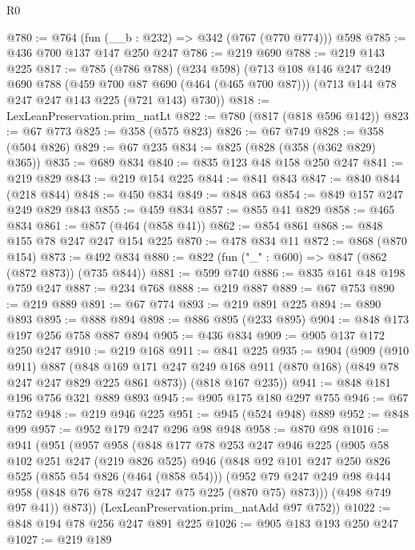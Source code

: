 \begin{lexlean}{R0}
\begin{coremodule}
@780 := @764 (fun (__b : @232) => @342 (@767 (@770 @774))) @598
@785 := @436 @700 @137 @147 @250 @247
@786 := @219 @690
@788 := @219 @143 @225
@817 := @785
    (@786 @788)
    (@234 @598)
    (@713
      @108
      @146
      @247
      @249
      @690
      @788
      (@459 @700 @87 @690 (@464 (@465 @700 @87)))
      (@713 @144 @78 @247 @247 @143 @225 (@721 @143) @730))
@818 := LexLeanPreservation.prim_natLt
@822 := @780 (@817 (@818 @596 @142))
@823 := @67 @773
@825 := @358 (@575 @823)
@826 := @67 @749
@828 := @358 (@504 @826)
@829 := @67 @235
@834 := @825 (@828 (@358 (@362 @829) @365))
@835 := @689 @834
@840 := @835 @123 @48 @158 @250 @247
@841 := @219 @829
@843 := @219 @154 @225
@844 := @841 @843
@847 := @840 @844 (@218 @844)
@848 := @450 @834
@849 := @848 @63
@854 := @849 @157 @247 @249 @829 @843
@855 := @459 @834
@857 := @855 @41 @829
@858 := @465 @834
@861 := @857 (@464 (@858 @41))
@862 := @854 @861
@868 := @848 @155 @78 @247 @247 @154 @225
@870 := @478 @834 @11
@872 := @868 (@870 @154)
@873 := @492 @834
@880 := @822 (fun ("_" : @600) => @847 (@862 (@872 @873)) (@735 @844))
@881 := @599 @740
@886 := @835 @161 @48 @198 @759 @247
@887 := @234 @768
@888 := @219 @887
@889 := @67 @753
@890 := @219 @889
@891 := @67 @774
@893 := @219 @891 @225
@894 := @890 @893
@895 := @888 @894
@898 := @886 @895 (@233 @895)
@904 := @848 @173 @197 @256 @758 @887 @894
@905 := @436 @834
@909 := @905 @137 @172 @250 @247
@910 := @219 @168
@911 := @841 @225
@935 := @904
    (@909
      (@910 @911)
      @887
      (@848 @169 @171 @247 @249 @168 @911 (@870 @168) (@849 @78 @247 @247 @829 @225 @861 @873))
      (@818 @167 @235))
@941 := @848 @181 @196 @756 @321 @889 @893
@945 := @905 @175 @180 @297 @755
@946 := @67 @752
@948 := @219 @946 @225
@951 := @945 (@524 @948) @889
@952 := @848 @99
@957 := @952 @179 @247 @296 @98 @948
@958 := @870 @98
@1016 := @941
    (@951
      (@957
        @958
        (@848
          @177
          @78
          @253
          @247
          @946
          @225
          (@905
            @58
            @102
            @251
            @247
            (@219 @826 @525)
            @946
            (@848
              @92
              @101
              @247
              @250
              @826
              @525
              (@855 @54 @826 (@464 (@858 @54)))
              (@952 @79 @247 @249 @98 @444 @958 (@848 @76 @78 @247 @247 @75 @225 (@870 @75) @873)))
            (@498 @749 @97 @41))
          @873))
      (LexLeanPreservation.prim_natAdd @97 @752))
@1022 := @848 @194 @78 @256 @247 @891 @225
@1026 := @905 @183 @193 @250 @247
@1027 := @219 @189

\end{coremodule}
\end{lexlean}
